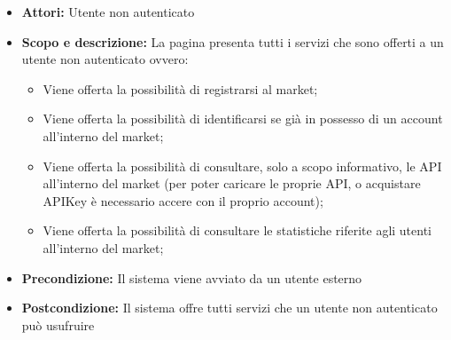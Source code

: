 \documentclass[12pt,a4paper,titlepage]{article}
\begin{document}
	\begin{itemize}
		\item \textbf{Attori:} Utente non autenticato
		\item \textbf{Scopo e descrizione:} La pagina presenta tutti i servizi che sono offerti a un utente non autenticato ovvero:
		\begin{itemize} 
			\item Viene offerta la possibilità di registrarsi al market; 
			\item Viene offerta la possibilità di identificarsi se già in possesso di un account all'interno del market;
			\item Viene offerta la possibilità di consultare, solo a scopo informativo, le API all'interno del market (per poter caricare le proprie API, o acquistare APIKey è necessario accere con il proprio account); 
			\item Viene offerta la possibilità di consultare le statistiche riferite agli utenti all'interno del market;
		\end{itemize}
		\item \textbf{Precondizione:} Il sistema viene avviato da un utente esterno
		\item \textbf{Postcondizione:} Il sistema offre tutti servizi che un utente non autenticato può usufruire
	\end{itemize}
\end{document}
